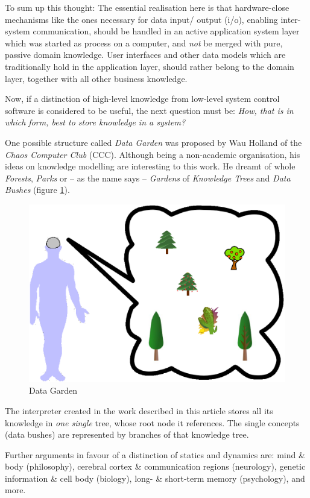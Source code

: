 To sum up this thought: The essential realisation here is that hardware-close
mechanisms like the ones necessary for data input/ output (i/o), enabling
inter-system communication, should be handled in an active application system
layer which was started as process on a computer, and \emph{not} be merged with
pure, passive domain knowledge. User interfaces and other data models which are
traditionally hold in the application layer, should rather belong to the domain
layer, together with all other business knowledge.

Now, if a distinction of high-level knowledge from low-level system control
software is considered to be useful, the next question must be: \textit{How,
that is in which form, best to store knowledge in a system?}

One possible structure called \emph{Data Garden} \cite{holland} was proposed by
Wau Holland of the \emph{Chaos Computer Club} (CCC). Although being a
non-academic organisation, his ideas on knowledge modelling are interesting to
this work. He dreamt of whole \emph{Forests}, \emph{Parks} or -- as the name
says -- \emph{Gardens} of \emph{Knowledge Trees} and \emph{Data Bushes} (figure
\ref{garden_figure}).

\begin{figure}[ht]
    \begin{center}
        \includegraphics[scale=0.2]{vector/garden.eps}
        \caption{Data Garden}
        \label{garden_figure}
    \end{center}
\end{figure}

The interpreter created in the work described in this article stores all its
knowledge in \emph{one single} tree, whose root node it references. The single
concepts (data bushes) are represented by branches of that knowledge tree.

Further arguments in favour of a distinction of statics and dynamics are: mind
\& body (philosophy), cerebral cortex \& communication regions (neurology),
genetic information \& cell body (biology), long- \& short-term memory
(psychology), and more.
